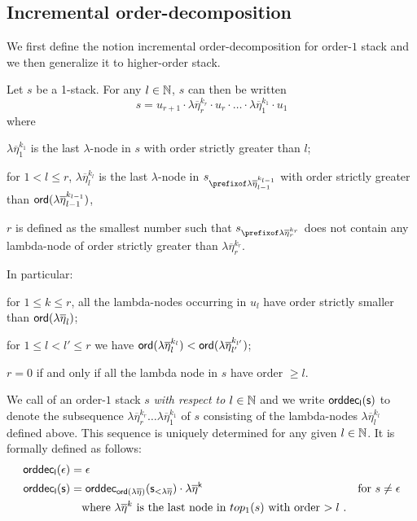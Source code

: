 \documentclass{article}
\theoremstyle{remark}
\theoremstyle{definition}
\newcommand\orddec{\sf orddec}
\begin{document}
\subsection{Incremental order-decomposition}

We first define the notion incremental order-decomposition for order-$1$ stack and we then generalize it to higher-order stack.

Let $s$ be a 1-stack. For any $l\in \mathbb{N}$, $s$ can then be written
$$ s = u_{r+1} \cdot \lambda \overline{\eta}_r^{k_r} \cdot u_r \cdot
\ldots \cdot \lambda \overline{\eta}_1^{k_1} \cdot  u_1 $$
where
\begin{compactitem}
\item  $\lambda \overline{\eta}_1^{k_1}$ is the
last $\lambda$-node in $s$ with order strictly greater than $l$;

\item for $1 < l \leq r$, $\lambda
\overline{\eta}_l^{k_l}$ is the last $\lambda$-node in $s_{\prefixof
\lambda \overline{\eta}_{l-1}^{k_{l-1}}}$ with order strictly
greater than ${\sf ord}(\lambda \overline{\eta}_{l-1}^{k_{l-1}})$,

\item  $r$ is defined as the smallest number such that
$s_{\prefixof \lambda \overline{\eta}_{r}^{k_{r}}}$ does not contain
any lambda-node of order strictly greater than $\lambda
\overline{\eta}_{r}^{k_{r}}$.
\end{compactitem}

\noindent In particular:
\begin{compactitem}
\item for $1 \leq k \leq r$, all the lambda-nodes occurring in $u_l$ have order
strictly smaller than ${\sf ord}(\lambda \overline{\eta}_l)$;
\item for $1\leq l<l'\leq r$ we have ${\sf ord}(\lambda \overline{\eta}_l^{k_l})
< {\sf ord}(\lambda \overline{\eta}_{l'}^{k_{l'}})$;
\item $r=0$ if and only if all the lambda node in $s$ have order $\geq l$.
\end{compactitem}
\smallskip

We call   of an order-$1$ stack $s$ \emph{with respect to $l\in \mathbb{N}$} and we write $\orddec_l(s)$ to denote the
subsequence $\lambda \overline{\eta}_r^{k_r} \ldots \lambda\overline{\eta}_1^{k_1}$ of $s$ consisting of the lambda-nodes $\lambda
\overline{\eta}_l^{k_l}$ defined above. This sequence is uniquely determined for any given $l\in \mathbb{N}$. It is formally defined as follows:
\begin{align*}
  \orddec_l(\epsilon) &= \epsilon \\
    \orddec_l(s) &=     \orddec_{\ord{\lambda\overline{\eta}}}(s_{<\lambda\overline{\eta}}) \cdot \lambda\overline{\eta}^k
&    \mbox{for } s\neq\epsilon \\
& \mbox{\quad where } \lambda\overline{\eta}^k \mbox{ is the last node in $top_1(s)$ with order $>l$\ .}
\end{align*}
\end{document}
